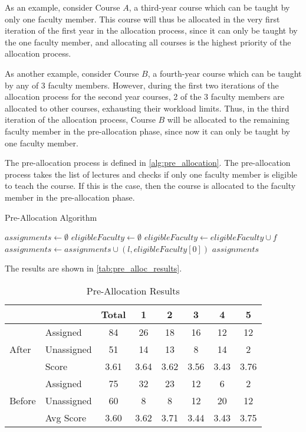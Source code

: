 As an example, consider Course $A$, a third-year course which can be taught by only one faculty member. This course will thus be allocated in the very first iteration of the first year in the allocation process, since it can only be taught by the one faculty member, and allocating all courses is the highest priority of the allocation process.

As another example, consider Course $B$, a fourth-year course which can be taught by any of 3 faculty members. However, during the first two iterations of the allocation process for the second year courses, 2 of the 3 faculty members are allocated to other courses, exhausting their workload limits. Thus, in the third iteration of the allocation process, Course $B$ will be allocated to the remaining faculty member in the pre-allocation phase, since now it can only be taught by one faculty member.

The pre-allocation process is defined in \autoref{alg:pre_allocation}. The pre-allocation process takes the list of lectures and checks if only one faculty member is eligible to teach the course. If this is the case, then the course is allocated to the faculty member in the pre-allocation phase.

\begin{algorithm}[H]
  \caption{Pre-Allocation Algorithm}
  \begin{algorithmic}[1]
    \State $assignments \gets \emptyset$
    \State $eligibleFaculty \gets \emptyset$
    \State $eligibleFaculty \gets eligibleFaculty \cup f$
    \EndIf
    \EndFor
    \State $assignments \gets assignments \cup (l, eligibleFaculty[0])$
    \EndIf
    \EndFor
    \State \Return $assignments$
    \EndProcedure
  \end{algorithmic}
  \label{alg:pre_allocation}
\end{algorithm}

The results are shown in \autoref{tab:pre_alloc_results}.

\begin{table}[H]
  \centering
  \begin{tabular}{|l|l|c|c|c|c|c|c|}
    \hline
           &            & Total & 1    & 2    & 3    & 4    & 5    \\ \hline
           & Assigned   & 84    & 26   & 18   & 16   & 12   & 12   \\
    After  & Unassigned & 51    & 14   & 13   & 8    & 14   & 2    \\
           & Score      & 3.61  & 3.64 & 3.62 & 3.56 & 3.43 & 3.76 \\ \hline
           & Assigned   & 75    & 32   & 23   & 12   & 6    & 2    \\
    Before & Unassigned & 60    & 8    & 8    & 12   & 20   & 12   \\
           & Avg Score  & 3.60  & 3.62 & 3.71 & 3.44 & 3.43 & 3.75 \\
    \hline
  \end{tabular}
  \caption{Pre-Allocation Results}
  \label{tab:pre_alloc_results}
\end{table}

